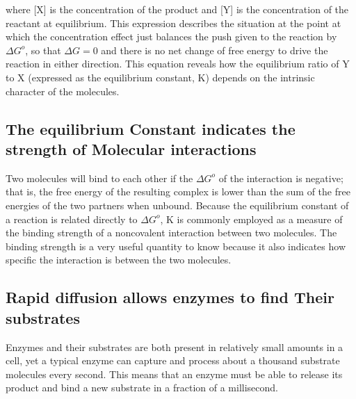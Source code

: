 where [X] is the concentration of the product and [Y] is the concentration
of the reactant at equilibrium. This expression describes the situation at
the point at which the concentration effect just balances the push given
to the reaction by $\Delta G^{o}$, so that $\Delta G = 0$ and there is no net change of free
energy to drive the reaction in either direction.
This equation reveals how the equilibrium ratio of Y to X (expressed as
the equilibrium constant, K) depends on the intrinsic character of the molecules.


\subsection{The equilibrium Constant indicates the strength of Molecular interactions}

Two molecules will bind to each other if the $\Delta G^{o}$ of the interaction is
negative; that is, the free energy of the resulting complex is lower than
the sum of the free energies of the two partners when unbound. Because
the equilibrium constant of a reaction is related directly to $\Delta G^{o}$, K is
commonly employed as a measure of the binding strength of a noncovalent
interaction between two molecules. The binding strength is a very useful
quantity to know because it also indicates how specific the interaction is
between the two molecules.


\subsection{Rapid diffusion allows enzymes to find Their substrates}

Enzymes and their substrates are both present in relatively small amounts
in a cell, yet a typical enzyme can capture and process about a thousand
substrate molecules every second. This means that an enzyme must be
able to release its product and bind a new substrate in a fraction of a
millisecond.


